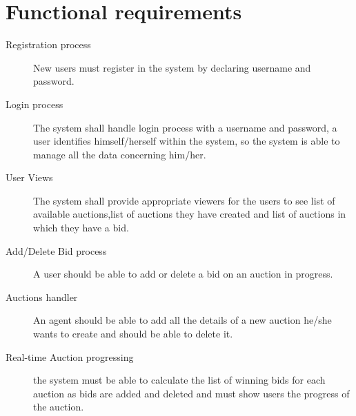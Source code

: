 \section{Functional requirements}\label{sec:functionalrequirements}

\begin{description}
	\item[Registration process] New users must register in the system by
		declaring username and password.
	\item[Login process] The system shall handle login process with a
		username and password, a user identifies himself/herself within
		the system, so the system is able to manage all the data
		concerning him/her.
	\item[User Views] The system shall provide appropriate viewers for the
		users to see list of available auctions,list of auctions they
		have created and list of auctions in which they have a bid.
	\item[Add/Delete Bid process] A user should be able to add or delete a
		bid on an auction in progress.
	\item[Auctions handler] An agent should be able to add all the details
		of a new auction he/she wants to create and should be able to
		delete it.
	\item[Real-time Auction progressing] the system must be able to
		calculate the list of winning bids for each auction as bids are
		added and deleted and must show users the progress of the
		auction.
\end{description}

